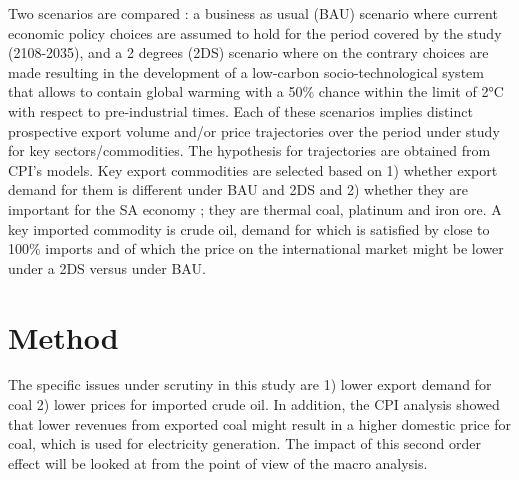 \documentclass[12pt,english]{article}
\begin{document}
Two scenarios are compared : a business as usual (BAU) scenario where current economic policy choices are assumed to hold for the period covered by the study (2108-2035), %
and a 2 degrees (2DS) scenario where on the contrary choices are made resulting in the development of a low-carbon socio-technological system that allows to contain %
global warming with a 50\% chance within the limit of 2°C with respect to pre-industrial times. Each of these scenarios implies distinct prospective export volume and/or price trajectories over the period under study for key sectors/commodities. The hypothesis for trajectories are obtained from CPI's models. Key export commodities are selected based on 1) whether export demand for them is different under BAU and 2DS and 2) whether they are important for the SA economy ; they are thermal coal, platinum and iron ore. A key imported commodity is crude oil, demand for which is satisfied by close to 100\% imports and of which the price on the international market might be lower under a 2DS versus under BAU. 




\section{Method}

The specific issues under scrutiny in this study are 1) lower export demand for coal 2) lower prices for imported crude oil. In addition, the CPI analysis showed that lower revenues from exported coal might result in a higher domestic price for coal, which is used for electricity generation. The impact of this second order effect will be looked at from the point of view of the macro analysis. 
\end{document}
